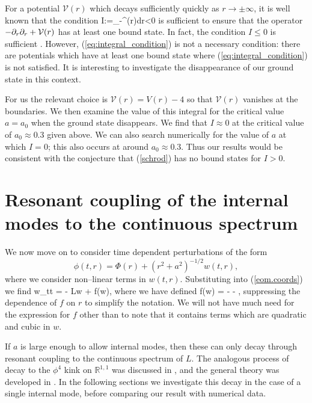 For a potential $\mathcal{V}(r)$ which decays sufficiently quickly as $r\rightarrow\pm\infty$, it is well known that the condition
\be
\label{eq:integral_condition}
I:=\int_{-\infty}^{\infty}(r)dr<0
\ee
is sufficient to ensure that the operator $-\partial_r\partial_r + \mathcal{V}(r)$ has at least one bound state. In fact, the condition $I\leq 0$ is sufficient \cite{BarrySimon}. However, (\ref{eq:integral_condition}) is not a necessary condition: there are potentials which have at least one bound state where (\ref{eq:integral_condition}) is not satisfied. It is interesting to investigate the disappearance of our ground state in this context.

For us the relevant choice is $\mathcal{V}(r)=V(r)-4$ so that $\mathcal{V}(r)$ vanishes at the boundaries. We then examine the value of this integral for the critical value $a=a_0$ when the ground state disappears. We find that $I\approx0$ at the critical value of $a_0 \approx 0.3$ given above. We can also search numerically for the value of $a$ at which $I=0$; this also occurs at around $a_0 \approx 0.3$. Thus our results would be consistent with the conjecture that (\ref{schrod}) has no bound states for $I>0$.

\section{Resonant coupling of the internal modes to the continuous spectrum} \label{sec:dynamics}
We now move on to consider time dependent perturbations of the form
\[
\phi(t,r) = \Phi(r) + (r^2+a^2)^{-1/2}w(t,r),
\]
where we consider non--linear terms in $w(t,r)$. Substituting into (\ref{eom.coords}) we find
\be
\label{eq:nonsmall_pert}
w_{tt} = - Lw + f(w),
\ee
where we have defined
\be \label{eq:f}
f(w) = -  - ,
\ee
suppressing the dependence of $f$ on $r$ to simplify the notation. We will not have much need for the expression for $f$ other than to note that it contains terms which are quadratic and cubic in $w$.

If $a$ is large enough to allow internal modes, then these can only decay through resonant coupling to the continuous spectrum of $L$. The analogous process of decay to the $\phi^4$ kink on $\mathbb{R}^{1,1}$ was discussed in \cite{Manton&Merabet}, and the general theory was developed in \cite{SW98}. In the following sections we investigate this decay in the case of a single internal mode, before comparing our result with numerical data.

